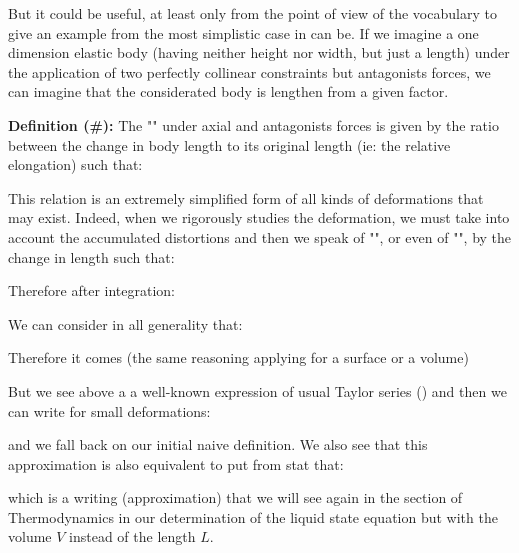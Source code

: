 	But it could be useful, at least only from the point of view of the vocabulary to give an example from the most simplistic case in can be. If we imagine a one dimension elastic body (having neither height nor width, but just a length) under the application of two perfectly collinear constraints but antagonists forces, we can imagine that the considerated body is lengthen from a given factor.
	
	\textbf{Definition (\#\mydef):} The "" under axial and antagonists forces is given by the ratio between the change in body length to its original length (ie: the relative elongation) such that:
	
	This relation is an extremely simplified form of all kinds of deformations that may exist. Indeed, when we rigorously studies the deformation, we must take into account the accumulated distortions and then we speak of "", or even of "", by the change in length such that:
	
	Therefore after integration:
	
	We can consider in all generality that:
	
	Therefore it comes (the same reasoning applying for a surface or a volume)
	
	But we see above a a well-known expression of usual Taylor series () and then we can write for small deformations:
	
	and we fall back on our initial naive definition. We also see that this approximation is also equivalent to put from stat that:
	
	which is a writing (approximation) that we will see again in the section of Thermodynamics in our determination of the liquid state equation but with the volume $V$ instead of the length $L$.
	
